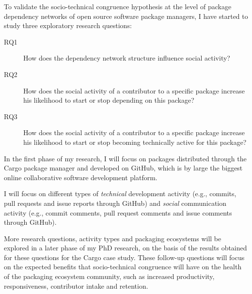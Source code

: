 To validate the socio-technical congruence hypothesis at the level of package dependency networks of open source software package managers, I have started to study three exploratory research questions: 
\begin{description}
\item[RQ1] How does the dependency network structure influence social activity? %
\item[RQ2] How does the social activity of a contributor to a specific package increase his likelihood to start or stop depending on this package?
\item[RQ3] How does the social activity of a contributor to a specific package increase his likelihood to start or stop becoming technically active for this package?
\end{description}

In the first phase of my research, I will focus on packages distributed through the Cargo package manager and developed on GitHub, which is by large the biggest online collaborative software development platform.

I will focus on different types of \emph{technical} development activity (e.g., commits, pull requests and issue reports through GitHub) and \emph{social} communication activity (e.g., commit comments, pull request comments and issue comments through GitHub). 

More research questions, activity types and packaging ecosystems will be explored in a later phase of my PhD research, on the basis of the results obtained for these questions for the Cargo case study. These follow-up questions will focus on the expected benefits that socio-technical congruence will have on the health of the packaging ecosystem community, such as increased productivity, responsiveness, contributor intake and retention.
